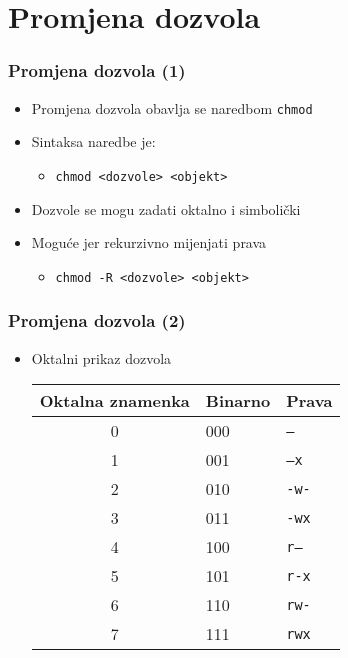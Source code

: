 \documentclass[table,usenames,dvipsnames]{beamer}
\newcommand{\shell}[1]{\texttt{#1}}
\begin{document}
\section{Promjena dozvola}
\begin{frame}[t]
\frametitle{Promjena dozvola (1)}
\begin{itemize}
  \item Promjena dozvola obavlja se naredbom \shell{chmod}
  \item Sintaksa naredbe je:
  \begin{itemize}
    \item[] \shell{chmod <dozvole> <objekt>}
  \end{itemize}
  \item Dozvole se mogu zadati oktalno i simbolički
  \item Moguće jer rekurzivno mijenjati prava
  \begin{itemize}
    \item[] \shell{chmod -R <dozvole> <objekt>}
  \end{itemize}
\end{itemize}
\end{frame}

\begin{frame}[t]
\frametitle{Promjena dozvola (2)}
\begin{itemize}
  \item Oktalni prikaz dozvola
  \begin{table}[h]
  \begin{tabular}{|c|l|l|}
    \hline
    \rowcolor{BlueViolet!20}Oktalna znamenka  & Binarno & Prava       \\
    \hline
    0                 & 000     & \shell{---} \\   
    \hline
    1                 & 001     & \shell{--x} \\
    \hline
    2                 & 010     & \shell{-w-} \\
    \hline
    3                 & 011     & \shell{-wx} \\ 
    \hline
    4                 & 100     & \shell{r--} \\
    \hline
    5                 & 101     & \shell{r-x} \\
    \hline
    6                 & 110     & \shell{rw-} \\
    \hline
    7                 & 111     & \shell{rwx} \\ 
    \hline
  \end{tabular}
  \end{table}
\end{itemize}
\end{frame}
\end{document}
